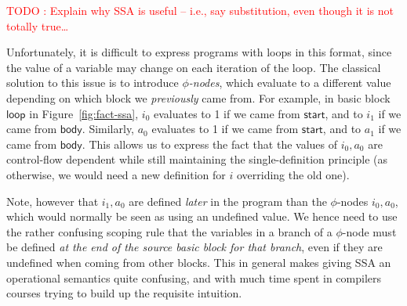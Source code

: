 \documentclass[acmsmall,screen,review]{acmart}
\newcounter{todos}
\newcommand{\todo}[1]{\stepcounter{todos} \textcolor{red}{TODO \arabic{todos}: #1}}
\newcommand{\ms}[1]{\ensuremath{\mathsf{#1}}}
\begin{document}
\todo{Explain why SSA is useful -- i.e., say substitution, even though it is not totally true\ldots}

Unfortunately, it is difficult to express programs with loops in this format, since the value of a
variable may change on each iteration of the loop. The classical solution to this issue is to
introduce \textit{$\phi$-nodes}, which evaluate to a different value depending on which block we
\textit{previously} came from. For example, in basic block \ms{loop} in
Figure~\ref{fig:fact-ssa}, $i_0$ evaluates to 1 if we came from \ms{start}, and to $i_1$ if we
came from \ms{body}. Similarly, $a_0$ evaluates to 1 if we came from \ms{start}, and to $a_1$ if we
came from \ms{body}. This allows us to express the fact that the values of $i_0, a_0$ are
control-flow dependent while still maintaining the single-definition principle (as otherwise, we
would need a new definition for $i$ overriding the old one).

Note, however that $i_1, a_0$ are defined \textit{later} in the program than the
$\phi$-nodes $i_0, a_0$, which would normally be seen as using an undefined
value. We hence need to use the rather confusing scoping rule that the variables
in a branch of a $\phi$-node must be defined \textit{at the end of the source
basic block for that branch}, even if they are undefined when coming from other blocks. This in
general makes giving SSA an operational semantics quite confusing, and with much
time spent in compilers courses trying to build up the requisite intuition.
\end{document}
